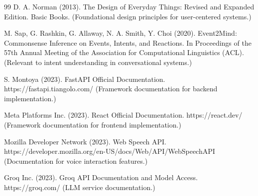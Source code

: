 \documentclass[oneside,a4paper,12pt]{report}
\begin{document}
\begin{thebibliography}{99}
 D. A. Norman (2013). The Design of Everyday Things: Revised and Expanded Edition. Basic Books. (Foundational design principles for user-centered systems.)
\vspace{2mm}

 M. Sap, G. Rashkin, G. Allaway, N. A. Smith, Y. Choi (2020). Event2Mind: Commonsense Inference on Events, Intents, and Reactions. In Proceedings of the 57th Annual Meeting of the Association for Computational Linguistics (ACL). (Relevant to intent understanding in conversational systems.)
\vspace{2mm}

 S. Montoya (2023). FastAPI Official Documentation. https://fastapi.tiangolo.com/ (Framework documentation for backend implementation.)
\vspace{2mm}

 Meta Platforms Inc. (2023). React Official Documentation. https://react.dev/ (Framework documentation for frontend implementation.)
\vspace{2mm}

 Mozilla Developer Network (2023). Web Speech API. https://developer.mozilla.org/en-US/docs/Web/API/Web\underline{}Speech\underline{}API (Documentation for voice interaction features.)
\vspace{2mm}

 Groq Inc. (2023). Groq API Documentation and Model Access. https://groq.com/ (LLM service documentation.)
\vspace{2mm}



\end{thebibliography}
\end{document}
